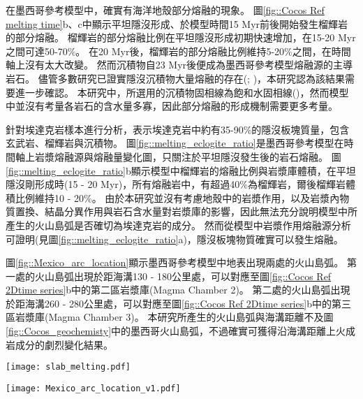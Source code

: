 在墨西哥參考模型中，確實有海洋地殼部分熔融的現象。
圖\ref{fig::Cocos Ref melting time}b、c中顯示平坦隱沒形成、於模型時間15 Myr前後開始發生榴輝岩的部分熔融。
榴輝岩的部分熔融比例在平坦隱沒形成初期快速增加，在15-20 Myr之間可達50-70$\%$。
在20 Myr後，榴輝岩的部分熔融比例維持5-20$\%$之間，在時間軸上沒有太大改變。
然而沉積物自23 Myr後便成為墨西哥參考模型熔融源的主導岩石。
儘管多數研究已證實隱沒沉積物大量熔融的存在(\citealp{van2011subduction}; \citealp{Forster2021})，本研究認為該結果需要進一步確認。
本研究中，所選用的沉積物固相線為飽和水固相線(\citealp{van2011subduction})，然而模型中並沒有考量各岩石的含水量多寡，因此部分熔融的形成機制需要更多考量。

\citealp{stern1996role}針對埃達克岩樣本進行分析，表示埃達克岩中約有35-90$\%$的隱沒板塊質量，包含玄武岩、榴輝岩與沉積物。
圖\ref{fig::melting_eclogite_ratio}是墨西哥參考模型在時間軸上岩漿熔融源與熔融量變化圖，只關注於平坦隱沒發生後的岩石熔融。
圖\ref{fig::melting_eclogite_ratio}b顯示模型中榴輝岩的熔融比例與岩漿庫體積，在平坦隱沒剛形成時(15 - 20 Myr)，所有熔融岩中，有超過40$\%$為榴輝岩，爾後榴輝岩體積比例維持10 - 20$\%$。
由於本研究並沒有考慮地殼中的岩漿作用，以及岩漿內物質置換、結晶分異作用與岩石含水量對岩漿庫的影響，因此無法充分說明模型中所產生的火山島弧是否確切為埃達克岩的成分。
然而從模型中岩漿作用熔融源分析可證明(見圖\ref{fig::melting_eclogite_ratio}a)，隱沒板塊物質確實可以發生熔融。

圖\ref{fig::Mexico_arc_location}顯示墨西哥參考模型中地表出現兩處的火山島弧。
第一處的火山島弧出現於距海溝130 - 180公里處，可以對應至圖\ref{fig::Cocos Ref 2Dtime series}b中的第二區岩漿庫(Magma Chamber 2)。
第二處的火山島弧出現於距海溝260 - 280公里處，可以對應至圖\ref{fig::Cocos Ref 2Dtime series}b中的第三區岩漿庫(Magma Chamber 3)。
本研究所產生的火山島弧與海溝距離不及圖\ref{fig::Cocos_geochemisty}中的墨西哥火山島弧，不過確實可獲得沿海溝距離上火成岩成分的劇烈變化結果。

\begin{figure*}[ht!]
    \centering
    \texttt{[image: slab\_melting.pdf]}
    \caption[墨西哥參考模型部分熔融源岩與岩漿庫分析]{墨西哥參考模型部分熔融源岩與岩漿庫分析。(a)同為\ref{fig::Cocos Ref melting time}b，聚焦在13-40 Myr時期的部分熔融源岩。(b)黃底柱狀為岩漿庫體積，藍點為榴輝岩瞬時熔融體積佔整體瞬時熔融體積的比例。
    }
    \label{fig::melting_eclogite_ratio}
\end{figure*}

\begin{figure*}[ht!]
    \centering
    \texttt{[image: Mexico\_arc\_location\_v1.pdf]}
    \caption[墨西哥參考模型火山島弧與海溝距離隨時間變化]{墨西哥參考模型火山島弧與海溝距離隨時間變化。其中咖啡色為熔融源岩以橄欖岩為主的火山島弧，藍色則為熔融源岩以沉積物與榴輝岩為主的火山島弧。
    }
    \label{fig::Mexico_arc_location}
\end{figure*}

